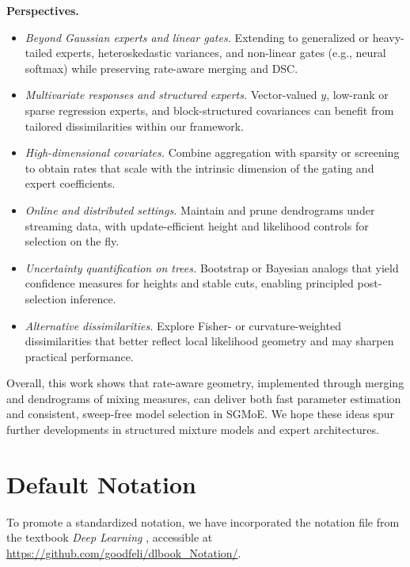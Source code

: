 \documentclass[twoside]{article}
\theoremstyle{plain}
\theoremstyle{definition}
\theoremstyle{plain}
\begin{document}
{\bf Perspectives.}
\begin{itemize}\itemsep0pt
\item {\it Beyond Gaussian experts and linear gates.} Extending to generalized or heavy-tailed experts, heteroskedastic variances, and non-linear gates (e.g., neural softmax) while preserving rate-aware merging and DSC.
\item {\it Multivariate responses and structured experts.} Vector-valued \(y\), low-rank or sparse regression experts, and block-structured covariances can benefit from tailored dissimilarities within our framework.
\item {\it High-dimensional covariates.} Combine aggregation with sparsity or screening to obtain rates that scale with the intrinsic dimension of the gating and expert coefficients.
\item {\it Online and distributed settings.} Maintain and prune dendrograms under streaming data, with update-efficient height and likelihood controls for selection on the fly.
\item {\it Uncertainty quantification on trees.} Bootstrap or Bayesian analogs that yield confidence measures for heights and stable cuts, enabling principled post-selection inference.
\item {\it Alternative dissimilarities.} Explore Fisher- or curvature-weighted dissimilarities that better reflect local likelihood geometry and may sharpen practical performance.
\end{itemize}

Overall, this work shows that rate-aware geometry, implemented through merging and dendrograms of mixing measures, can deliver both fast parameter estimation and consistent, sweep-free model selection in SGMoE. We hope these ideas spur further developments in structured mixture models and expert architectures.

\fi

\iffalse
\newpage
\section{Default Notation}

To promote a standardized notation, we have incorporated the notation file from the textbook {\it Deep Learning} \citep{goodfellow_deep_2016}, accessible at \url{https://github.com/goodfeli/dlbook_Notation/}. 
\end{document}
